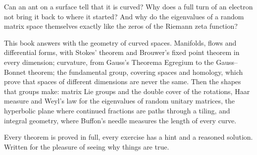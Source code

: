 Can an ant on a surface tell that it is curved? Why does a full turn of an electron not bring it back to where it started? And
why do the eigenvalues of a random matrix space themselves exactly like the zeros of the Riemann zeta function?

This book answers with the geometry of curved spaces. Manifolds, flows and differential forms, with Stokes' theorem and Brouwer's
fixed point theorem in every dimension; curvature, from Gauss's Theorema Egregium to the Gauss--Bonnet theorem; the fundamental
group, covering spaces and homology, which prove that spaces of different dimensions are never the same. Then the shapes that
groups make: matrix Lie groups and the double cover of the rotations, Haar measure and Weyl's law for the eigenvalues of random
unitary matrices, the hyperbolic plane where continued fractions are paths through a tiling, and integral geometry, where
Buffon's needle measures the length of every curve.

Every theorem is proved in full, every exercise has a hint and a reasoned solution. Written for the pleasure of seeing why things are true.
